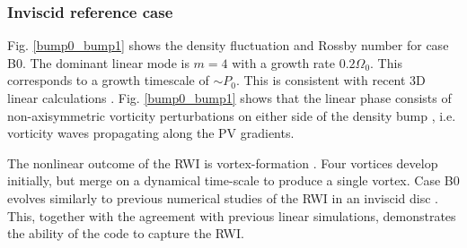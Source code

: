 \subsubsection{Inviscid reference case}
Fig. \ref{bump0_bump1} 
shows the density fluctuation and Rossby number for
case B0. The dominant linear mode is $m=4$ with a growth rate
$0.2\Omega_0$. This 
corresponds to a growth timescale of $\sim P_0$. 
This is consistent with recent 3D linear calculations
\citep{meheut12,lin13}. Fig. \ref{bump0_bump1} shows that the
linear phase consists of non-axisymmetric vorticity perturbations on
either side of the density bump \citep{umurhan10}, i.e. vorticity
waves propagating along the PV gradients.     

The nonlinear outcome of the RWI is vortex-formation
\citep{li00}. Four vortices develop initially, but 
merge on a dynamical time-scale to produce 
a single vortex. %
 Case B0 evolves similarly to previous numerical  
studies of the RWI in an inviscid disc
\citep[e.g.][where more detailed analyses are 
given]{meheut10,meheut12b}. This, together with the agreement with
previous linear simulations, demonstrates the ability of the \pluto
code to capture the RWI. 

